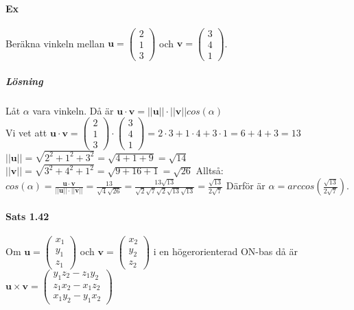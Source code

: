 \paragraph{Ex} Beräkna vinkeln mellan $\bm{u}=\begin{pmatrix}2\\1\\3\end{pmatrix}$ och $\bm{v}=\begin{pmatrix}3\\4\\1\end{pmatrix}$.
\subparagraph{Lösning} Låt $\alpha$ vara vinkeln. Då är $\bm{u}\cdot \bm{v} = ||\bm{u}||\cdot ||\bm{v}||cos(\alpha)$\\
Vi vet att $\bm{u}\cdot \bm{v}=\begin{pmatrix}2\\1\\3\end{pmatrix}\cdot \begin{pmatrix}3\\4\\1\end{pmatrix}=2\cdot 3+1\cdot 4+3\cdot 1=6+4+3=13$
$||\bm{u}||=\sqrt{2^{2}+1^{2}+3^{2}}=\sqrt{4+1+9}=\sqrt{14}$
$||\bm{v}||=\sqrt{3^{2}+4^{2}+1^{2}}=\sqrt{9+16+1}=\sqrt{26}$
Alltså: $cos(\alpha)=\frac{\bm{u}\cdot \bm{v}}{||\bm{u}||\cdot ||\bm{v}||}=\frac{13}{\sqrt{4}\sqrt{26}}=\frac{13\sqrt{13}}{\sqrt{2}\sqrt{7}\sqrt{2}\sqrt{13}\sqrt{13}}=\frac{\sqrt{13}}{2\sqrt{7}}$
Därför är $\alpha=arccos(\frac{\sqrt{13}}{2\sqrt{7}})$.

\paragraph{Sats 1.42} Om $\bm{u}=\begin{pmatrix}x_{1}\\y_{1}\\z_{1}\end{pmatrix}$ och $\bm{v}=\begin{pmatrix}x_{2}\\y_{2}\\z_{2}\end{pmatrix}$ i en högerorienterad ON-bas då är $\bm{u}\times \bm{v}=\begin{pmatrix}
    y_{1}z_{2}-z_{1}y_{2}\\
    z_{1}x_{2}-x_{1}z_{2}\\
    x_{1}y_{2}-y_{1}x_{2}
\end{pmatrix}$

